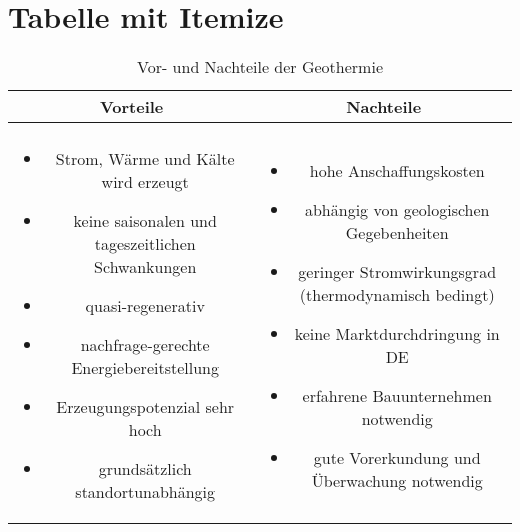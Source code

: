 \section*{Tabelle mit Itemize}
\vspace*{-2.5mm}
\renewcommand{\arraystretch}{1.2}
\begin{table}[h!]
	\centering
	\caption*{Vor- und Nachteile der Geothermie}
	\label{tab:tabelle1}
	\begin{tabulary}{\textwidth}{C|C}
		\hline
		\textbf{Vorteile}  &\textbf{Nachteile} \\ 
		\hline
		&\\
		\begin{minipage}[t]{0.4\textwidth}
			\begin{itemize}
				\item Strom, Wärme und Kälte wird erzeugt
				\item keine saisonalen und tageszeitlichen Schwankungen
				\item 	quasi-regenerativ
				\item 	nachfrage-gerechte Energiebereitstellung
				\item Erzeugungspotenzial sehr hoch 
				\item 	grundsätzlich standortunabhängig
			\end{itemize}
		\end{minipage} & 
		\begin{minipage}[t]{0.4\textwidth}
			\begin{itemize}
				\item hohe Anschaffungskosten
				\item abhängig von geologischen Gegebenheiten
				\item geringer Stromwirkungsgrad (thermodynamisch bedingt)
				\item keine Marktdurchdringung in DE
				\item erfahrene Bauunternehmen notwendig
				\item gute Vorerkundung und Überwachung notwendig
			\end{itemize}
		\end{minipage}\\
	\end{tabulary}
\end{table}
\FloatBarrier
\vspace*{-2.5mm}

\newpage

